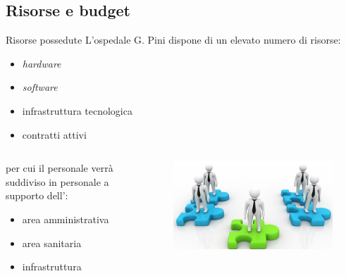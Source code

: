 \subsection{Risorse e budget}
\begin{frame}{Risorse possedute}
L'ospedale G. Pini dispone di un elevato numero di risorse:
\begin{itemize}
\item{\textit{hardware}}
\item{\textit{software}}
\item{infrastruttura tecnologica}
\item{contratti attivi}
\end{itemize}
\vspace{5mm}
\begin{columns}
\begin{column}{0.7\textwidth}
per cui il personale verrà suddiviso in personale a supporto dell':
\begin{itemize}
\item{area amministrativa}
\item{area sanitaria}
\item{infrastruttura}
\end{itemize}
\end{column}
\begin{column}{0.3\textwidth}
\begin{figure}
\includegraphics[scale=0.15]{Images/Categories.png}
\end{figure}
\end{column}
\end{columns}
\end{frame}

